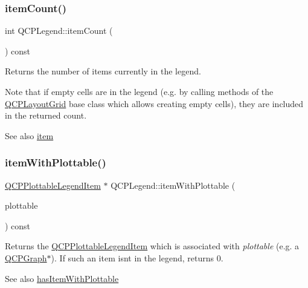 \subsubsection{\texorpdfstring{item\+Count()}{itemCount()}}
{\footnotesize\ttfamily int Q\+C\+P\+Legend\+::item\+Count (\begin{DoxyParamCaption}{ }\end{DoxyParamCaption}) const}

Returns the number of items currently in the legend.

Note that if empty cells are in the legend (e.\+g. by calling methods of the \mbox{\hyperlink{class_q_c_p_layout_grid}{Q\+C\+P\+Layout\+Grid}} base class which allows creating empty cells), they are included in the returned count.

\begin{DoxySeeAlso}{See also}
\mbox{\hyperlink{class_q_c_p_legend_acfe9694c45104a3359d3806ed366fcf7}{item}} 
\end{DoxySeeAlso}
\mbox{\label{class_q_c_p_legend_a91e790002d8bf15a20628a8e8841e397}} 
\subsubsection{\texorpdfstring{item\+With\+Plottable()}{itemWithPlottable()}}
{\footnotesize\ttfamily \mbox{\hyperlink{class_q_c_p_plottable_legend_item}{Q\+C\+P\+Plottable\+Legend\+Item}} $\ast$ Q\+C\+P\+Legend\+::item\+With\+Plottable (\begin{DoxyParamCaption}\item[{const \mbox{\hyperlink{class_q_c_p_abstract_plottable}{Q\+C\+P\+Abstract\+Plottable}} $\ast$}]{plottable }\end{DoxyParamCaption}) const}

Returns the \mbox{\hyperlink{class_q_c_p_plottable_legend_item}{Q\+C\+P\+Plottable\+Legend\+Item}} which is associated with {\itshape plottable} (e.\+g. a \mbox{\hyperlink{class_q_c_p_graph}{Q\+C\+P\+Graph}}$\ast$). If such an item isn\textquotesingle{}t in the legend, returns 0.

\begin{DoxySeeAlso}{See also}
\mbox{\hyperlink{class_q_c_p_legend_a4b90a442af871582df85c2bc13f91e88}{has\+Item\+With\+Plottable}} 
\end{DoxySeeAlso}
\mbox{\label{class_q_c_p_legend_ac91595c3eaa746fe6321d2eb952c63bb}} 
